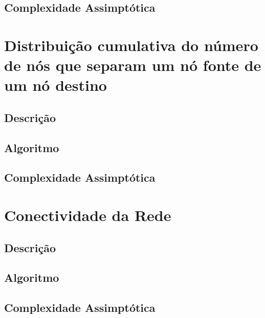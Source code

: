 \documentclass[12pt,a4paper]{scrartcl}
\begin{document}
\subsection{Complexidade Assimptótica}

\section{Distribuição cumulativa do número de nós que separam um nó fonte de um nó destino}

\subsection{Descrição}

\subsection{Algoritmo}

\subsection{Complexidade Assimptótica}

\section{Conectividade da Rede}

\subsection{Descrição}

\subsection{Algoritmo}

\subsection{Complexidade Assimptótica}
\end{document}
